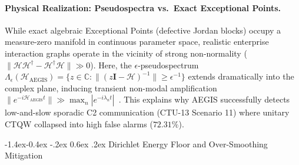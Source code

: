 \documentclass[10pt,twocolumn,letterpaper]{article}
\makeatletter
\renewcommand\subsection{\@startsection{subsection}{2}{\z@}%
                                     {-1.4ex\@plus -0.4ex \@minus -.2ex}%
                                     {0.6ex \@plus .2ex}%
                                     {\normalfont\normalsize\bfseries}}
\makeatother
\begin{document}
\paragraph{Physical Realization: Pseudospectra vs.\ Exact Exceptional Points.}
While exact algebraic Exceptional Points (defective Jordan blocks) occupy a measure-zero manifold in continuous parameter space, realistic enterprise interaction graphs operate in the vicinity of strong non-normality ($\|\mathcal{H} \mathcal{H}^\dagger - \mathcal{H}^\dagger \mathcal{H}\| \gg 0$). Here, the $\epsilon$-pseudospectrum $\Lambda_\epsilon(\mathcal{H}_{\text{AEGIS}}) = \{z \in \mathbb{C} : \|(z\mathbf{I} - \mathcal{H})^{-1}\| \ge \epsilon^{-1}\}$ extends dramatically into the complex plane, inducing transient non-modal amplification $\|e^{-i\mathcal{H}_{\text{AEGIS}} t}\| \gg \max_n |e^{-i\lambda_n t}|$~\cite{trefethen2005spectra}. This explains why AEGIS successfully detects low-and-slow sporadic C2 communication (CTU-13 Scenario 11) where unitary CTQW collapsed into high false alarms ($72.31\%$).

\subsection{Dirichlet Energy Floor and Over-Smoothing Mitigation}
\end{document}
